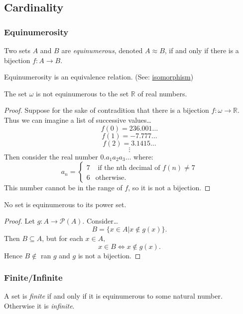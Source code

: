 \subsection{Cardinality}\label{cardinality}

\subsubsection{Equinumerosity}
Two sets $A$ and $B$ are \emph{equinumerous}, denoted $A \approx B$, if and only if there is a bijection $f : A \rightarrow B.$ \label{equinumerous}

\begin{proposition}
Equinumerosity is an equivalence relation. (See: \hyperref[isomorphism]{isomorphism})
\end{proposition}

\begin{theorem}[Diagonalization]\label{diagonalization}
The set $\omega$ is not equinumerous to the set $\mathbb{R}$ of real numbers.
\end{theorem}

\begin{proof}\renewcommand{\qedsymbol}{\Lightning}
Suppose for the sake of contradition that there is a bijection $f: \omega \rightarrow \mathbb{R}$. Thus we can imagine a list of successive values\dots
$$f(0) = 236.001\dots$$
$$f(1) = -7.777\dots$$
$$f(2) = 3.1415\dots$$
$$\vdots$$
Then consider the real number $0.a_1a_2a_3\dots$ where:
\[
	a_n = \begin{cases}
				7 & \textrm{ if the nth decimal of } f(n) \neq 7\\
				6 & \textrm{otherwise.}
		  \end{cases}
\]
This number cannot be in the range of $f$, so it is not a bijection.
\end{proof}

\begin{theorem}[Diagonalization]
No set is equinumerous to its power set.
\end{theorem}

\begin{proof}
Let $g: A \rightarrow \mathcal{P}(A)$. Consider\dots
$$B = \{ x \in A | x \not \in g(x) \}.$$
Then $B \subseteq A$, but for each $x \in A,$
$$x \in B \Leftrightarrow x \not\in g(x).$$
Hence $B \not\in$ ran $g$ and $g$ is not a bijection.
\end{proof}

\subsubsection{Finite/Infinite}
A set is \emph{finite}\label{infinite} if and only if it is equinumerous to some natural number. Otherwise it is \emph{infinite}\label{infinite}.

